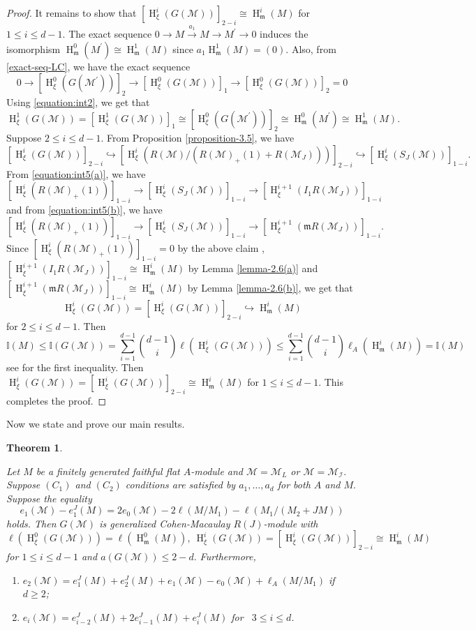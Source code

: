 \documentclass[11pt,reqno]{amsart}
\newtheorem{theorem}{Theorem}[section]
\theoremstyle{definition}
\newcommand{\m}{\mathfrak m}
\def\M{{\mathcal M}}
\def\I{{\mathcal I}}
\DeclareMathOperator{\h}{H}
\numberwithin{equation}{section}
\begin{document}
\begin{proof}
It remains to show that $[\h^i_{\xi}(G(\M))]_{2-i}\cong \h^i_\m(M)$ for $1\leq i\leq d-1.$ 
The exact sequence $0\to M\xrightarrow{a_1} M\to M^\prime\to 0$ induces the isomorphism $\h^0_\m(M^\prime)\cong \h^1_\m(M)$ since 
$a_1\h^1_\m(M)=(0).$ Also, from \eqref{exact-seq-LC}, we have the exact sequence
$$0\to [\h ^0_{\xi}(G(\M^\prime))]_{2}\to [\h^0_{\xi}(G(\M))]_{1} \to [\h^0_{\xi}(G(\M))]_{2}=0 $$
Using \eqref{equation:int2}, we get that 
$$\h^1_{\xi}(G(\M))=[\h^1_{\xi}(G(\M))]_{1}\cong [\h^0_{\xi}(G(\M^\prime))]_{2}\cong \h^0_\m(M^\prime)\cong \h^1_\m(M).$$ 
Suppose $2\leq i\leq d-1.$  From Proposition \ref{proposition-3.5},
we have
$$[\h^i_{\xi}(G(\M))]_{2-i}\hookrightarrow [\h^i_{\xi}(R(\M)/(R(\M)_+(1)+R(\M_J)))]_{2-i}\hookrightarrow [\h^i_{\xi}(S_J(\M))]_{1-i}.$$ From \eqref{equation:int5(a)}, we have
$$[\h^{i}_{\xi}(R(\M)_+(1))]_{1-i}\to [\h^{i}_{\xi}(S_J(\M))]_{1-i}\to [\h^{i+1}_{\xi}(I_1 R(\M_J))]_{1-i}$$ and from \eqref{equation:int5(b)}, we have
$$[\h^{i}_{\xi}(R(\M)_+(1))]_{1-i}\to [\h^{i}_{\xi}(S_J(\M))]_{1-i}\to [\h^{i+1}_{\xi}(\m R(\M_J))]_{1-i}.$$
Since $[\h^{i}_{\xi}(R(\M)_+(1))]_{1-i}=0$ by the above claim , $[\h^{i+1}_{\xi}(I_1 R(\M_J))]_{1-i}\cong \h^i_\m(M)$ by Lemma \ref{lemma-2.6(a)} and $[\h^{i+1}_{\xi}(\m R(\M_J))]_{1-i}\cong \h^i_\m(M)$ by Lemma \ref{lemma-2.6(b)}, we get that
$$\h^i_{\xi}(G(\M))=[\h^i_{\xi}(G(\M))]_{2-i}\hookrightarrow \h^i_\m(M)$$
for $2\leq i\leq d-1.$ Then 
\begin{equation*}
	\mathbb{I}(M)\leq \mathbb{I}(G(\M))=\mathop\sum\limits^{d-1}_{i=1}\binom{d-1}{i}\ell(\h^i_{\xi}(G(\M)))\leq \mathop\sum\limits^{d-1}_{i=1}\binom{d-1}{i}\ell_A(\h^i_\m(M))=\mathbb{I}(M)
\end{equation*}
see \cite[Corollary 5.2]{trung-gcm} for the first inequality. Then  
$\h^i_{\xi}(G(\M))=[\h^i_{\xi}(G(\M))]_{2-i}\cong\h^i_\m(M)$ for $1\leq i\leq d-1.$ This completes the proof. 
\end{proof}
Now we state and prove our main results. 
\begin{theorem}\label{m1}

	 Let $M$ be a finitely generated faithful flat $A$-module and $\M=\M_L$ or $\M=\M_\I.$ Suppose $(C_1)$ and $(C_2)$ conditions are satisfied by $a_1,\ldots,a_d$ for both $A$ and $M.$ Suppose the equality \begin{equation*}e_1(\M)-e_1^J(M)=2e_0(\M)-2\ell(M/M_1)-\ell(M_1/(M_2+JM))
	\end{equation*}  holds. Then $G(\M)$ is generalized Cohen-Macaulay $R(J)$-module with $$\ell(\h^0_{\xi}(G(\M)))=\ell(\h^0_{\m}(M)),~ \h^i_{\xi}(G(\M))=[\h^i_{\xi}(G(\M))]_{2-i}\cong \h^i_{\m}(M)$$ for $1\leq i\leq d-1$ and $a(G(\M))\leq 2-d.$ Furthermore, 
	\begin{enumerate}
	 \item\label{the-theorem-implicaitons-cond-4} $e_2(\M)=e_1^J(M)+e_2^J(M)+e_1(\M)-e_0(\M)+\ell_A(M/M_1)$ \mbox{if } $d\geq 2$;
	\item\label{the-theorem-implicaitons-cond-5} $e_i(\M)=e_{i-2}^J(M)+2e_{i-1}^J(M)+e_i^J(M)$ \mbox{for } $3\leq i\leq d$. 
		\end{enumerate}
\end{theorem}
\end{document}
